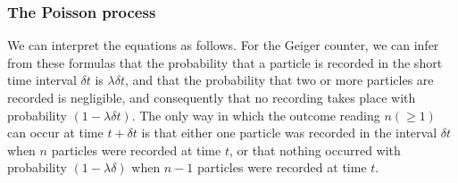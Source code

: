 \documentclass[spanish]{beamer}
\begin{document}
\begin{frame}
\frametitle{The Poisson process}

We can interpret the equations as follows. For the Geiger counter, we can infer from these formulas that the probability that a particle is recorded in the short time interval $\delta t$ is $ \lambda \delta t$, and that the probability that two or more particles are recorded is negligible, and consequently that no recording takes place with probability $(1 - \lambda \delta t)$. The only way in which the outcome reading $n(\geq 1)$ can occur at time $t + \delta t$ is that either one particle was recorded in the interval $\delta t$ when $n$ particles were
recorded at time $t$, or that nothing occurred with probability $(1 - \lambda \delta)$ when $n-1$ particles were recorded at time $t$.
\end{frame}
\end{document}

